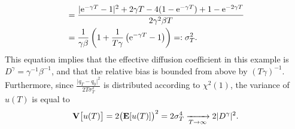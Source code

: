 \documentclass[11pt,a4paper]{article}
\begin{document}
\begin{example}
\begin{align*}
        &= \frac{\lvert \mathrm{e}^{-\gamma T} - 1 \rvert^2 + 2 \gamma T - 4 (1 - \mathrm{e}^{-\gamma T}) +  1 - \mathrm{e}^{-2 \gamma T}}{2 \gamma^2 \beta T} \\
        &= \frac{1}{\gamma \beta} \left( 1 + \frac{1}{T \gamma} \left(\mathrm{e}^{-\gamma T} - 1\right) \right) =: \sigma_T^2.
    \end{align*}
    This equation implies that the effective diffusion coefficient in this example is $D^{\gamma} = \gamma^{-1} \beta^{-1}$,
    and that the relative bias is bounded from above by $(T \gamma)^{-1}$.
    Furthermore,
    since $\frac{\lvert q_T- q_0 \rvert^2}{2T\sigma_T^2}$ is distributed according to $\chi^2(1)$,
    the variance of $u(T)$ is equal to
    \[
        \mathbf{V} \bigl[u(T)\bigr] = 2  \bigl(\mathbf{E} [u(T)]\bigr)^2 = 2 \sigma_T^4 \xrightarrow[T \to \infty]{} 2 \lvert D^{\gamma} \rvert^2 .
    \]
\end{example}
\end{document}
